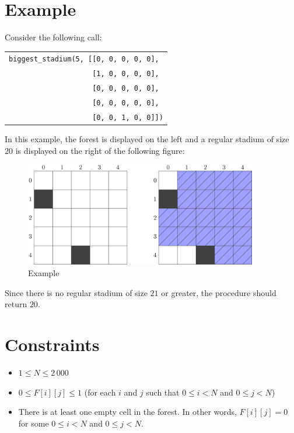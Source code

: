 \section*{Example}

Consider the following call:

\begin{tabular}{| l |}
  \hline
  \verb|biggest_stadium(5, [[0, 0, 0, 0, 0],| \\
  \verb|                    [1, 0, 0, 0, 0],| \\
  \verb|                    [0, 0, 0, 0, 0],| \\
  \verb|                    [0, 0, 0, 0, 0],| \\
  \verb|                    [0, 0, 1, 0, 0]])| \\
  \hline
\end{tabular}

In this example, the forest is displayed on the left and a regular
stadium of size $20$ is displayed on the right of the following
figure:

\begin{figure}[h!]
\centering
\includegraphics[width=4in]{soccer-regular.png}
\caption{Example}
\end{figure}

Since there is no regular stadium of size $21$ or greater, the
procedure should return $20$.

\section*{Constraints}

\begin{itemize}
\item
  $1 \le N \le 2\,000$
\item
  $0 \le F[i][j] \le 1$ (for each $i$ and $j$ such that
  $0 \le i < N$ and $0 \le j < N$)
\item
  There is at least one empty cell in the forest. In other words,
  $F[i][j] = 0$ for some $0 \le i < N$ and $0 \le j < N$.
\end{itemize}

